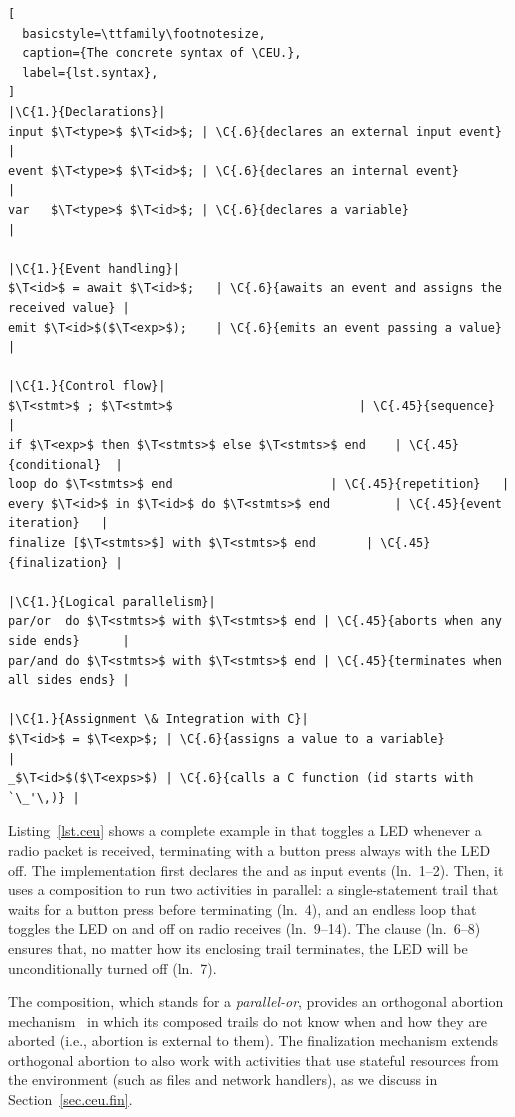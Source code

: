 \bgroup
\def\T<#1>{\langle\mathit{#1}\rangle}
\def\C#1#2{\hfill\rmfamily\itshape\makebox[#1\columnwidth][l]{//~#2}}
\begin{lstlisting}[
  basicstyle=\ttfamily\footnotesize,
  caption={The concrete syntax of \CEU.},
  label={lst.syntax},
]
|\C{1.}{Declarations}|
input $\T<type>$ $\T<id>$; | \C{.6}{declares an external input event} |
event $\T<type>$ $\T<id>$; | \C{.6}{declares an internal event}       |
var   $\T<type>$ $\T<id>$; | \C{.6}{declares a variable}              |

|\C{1.}{Event handling}|
$\T<id>$ = await $\T<id>$;   | \C{.6}{awaits an event and assigns the received value} |
emit $\T<id>$($\T<exp>$);    | \C{.6}{emits an event passing a value} |

|\C{1.}{Control flow}|
$\T<stmt>$ ; $\T<stmt>$                          | \C{.45}{sequence}     |
if $\T<exp>$ then $\T<stmts>$ else $\T<stmts>$ end    | \C{.45}{conditional}  |
loop do $\T<stmts>$ end                      | \C{.45}{repetition}   |
every $\T<id>$ in $\T<id>$ do $\T<stmts>$ end         | \C{.45}{event iteration}   |
finalize [$\T<stmts>$] with $\T<stmts>$ end       | \C{.45}{finalization} |

|\C{1.}{Logical parallelism}|
par/or  do $\T<stmts>$ with $\T<stmts>$ end | \C{.45}{aborts when any side ends}      |
par/and do $\T<stmts>$ with $\T<stmts>$ end | \C{.45}{terminates when all sides ends} |

|\C{1.}{Assignment \& Integration with C}|
$\T<id>$ = $\T<exp>$; | \C{.6}{assigns a value to a variable}              |
_$\T<id>$($\T<exps>$) | \C{.6}{calls a C function (id starts with `\_'\,)} |
\end{lstlisting}
\egroup

Listing~\ref{lst.ceu} shows a complete example in \CEU that toggles a LED
whenever a radio packet is received, terminating with a button press always
with the LED off.
%
The implementation first declares the  and  as
input events (ln.~1--2).
Then, it uses a  composition to run two activities in parallel:
a single-statement trail that waits for a button press before terminating
(ln.~4), and an endless loop that toggles the LED on and off on radio receives
(ln.~9--14).
The  clause (ln.~6--8) ensures that, no matter how its enclosing
trail terminates, the LED will be unconditionally turned off (ln.~7).

The  composition, which stands for a \emph{parallel-or}, provides
an orthogonal abortion mechanism~\cite{esterel.preemption} in which its
composed trails do not know when and how they are aborted (i.e., abortion is
external to them).
%
%
The finalization mechanism extends orthogonal abortion to also work with
activities that use stateful resources from the environment (such as files and
network handlers), as we discuss in Section~\ref{sec.ceu.fin}.
%

